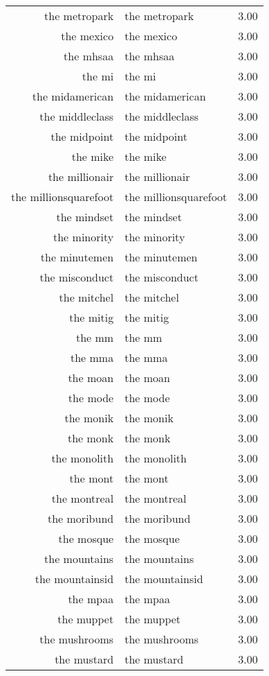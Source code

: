 \begin{table}[ht]
\begin{tabular}{rlr}
  the metropark & the metropark & 3.00 \\ 
  the mexico & the mexico & 3.00 \\ 
  the mhsaa & the mhsaa & 3.00 \\ 
  the mi & the mi & 3.00 \\ 
  the midamerican & the midamerican & 3.00 \\ 
  the middleclass & the middleclass & 3.00 \\ 
  the midpoint & the midpoint & 3.00 \\ 
  the mike & the mike & 3.00 \\ 
  the millionair & the millionair & 3.00 \\ 
  the millionsquarefoot & the millionsquarefoot & 3.00 \\ 
  the mindset & the mindset & 3.00 \\ 
  the minority & the minority & 3.00 \\ 
  the minutemen & the minutemen & 3.00 \\ 
  the misconduct & the misconduct & 3.00 \\ 
  the mitchel & the mitchel & 3.00 \\ 
  the mitig & the mitig & 3.00 \\ 
  the mm & the mm & 3.00 \\ 
  the mma & the mma & 3.00 \\ 
  the moan & the moan & 3.00 \\ 
  the mode & the mode & 3.00 \\ 
  the monik & the monik & 3.00 \\ 
  the monk & the monk & 3.00 \\ 
  the monolith & the monolith & 3.00 \\ 
  the mont & the mont & 3.00 \\ 
  the montreal & the montreal & 3.00 \\ 
  the moribund & the moribund & 3.00 \\ 
  the mosque & the mosque & 3.00 \\ 
  the mountains & the mountains & 3.00 \\ 
  the mountainsid & the mountainsid & 3.00 \\ 
  the mpaa & the mpaa & 3.00 \\ 
  the muppet & the muppet & 3.00 \\ 
  the mushrooms & the mushrooms & 3.00 \\ 
  the mustard & the mustard & 3.00 \\ 

\end{tabular}
\end{table}
